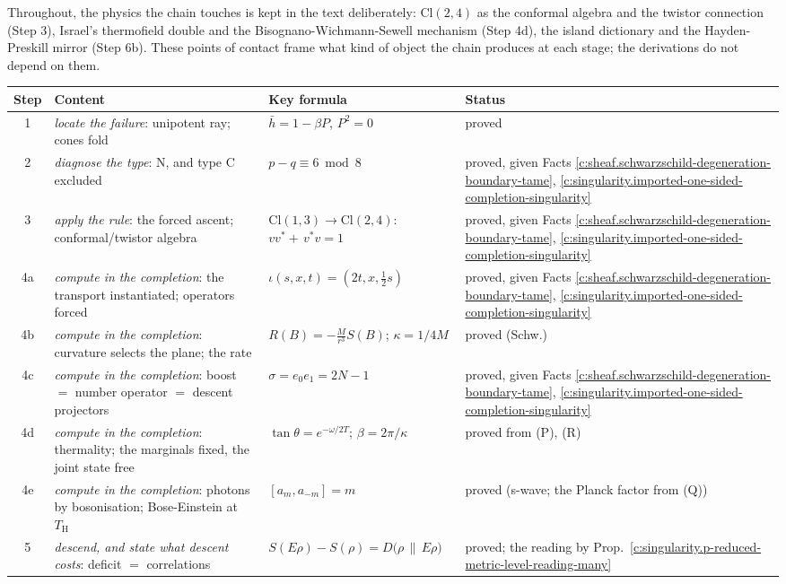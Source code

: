\documentclass[11pt]{article}
\theoremstyle{definition}
\theoremstyle{plain}
\providecommand{\Cl}{}\renewcommand{\Cl}{\mathrm{Cl}}
\providecommand{\TH}{}\renewcommand{\TH}{T_{\mathrm{H}}}
\providecommand{\hb}{}\renewcommand{\hb}{\bar{h}}
\providecommand{\rel}{}\renewcommand{\rel}[2]{D\bigl(#1 \,\|\, #2\bigr)}
\begin{document}
Throughout, the physics the chain touches is kept in the text deliberately: $\Cl(2,4)$ as the conformal algebra and the twistor connection (Step 3), Israel's thermofield double and the Bisognano-Wichmann-Sewell mechanism (Step 4d), the island dictionary and the Hayden-Preskill mirror (Step 6b). These points of contact frame what kind of object the chain produces at each stage; the derivations do not depend on them.

 \begin{tabular}{c>{ \arraybackslash}p{4.7cm}>{ \arraybackslash}p{4.6cm}l}
\toprule
Step & Content & Key formula & Status \\
\midrule
1 & \emph{locate the failure}: unipotent ray; cones fold & $\hb = 1 - \beta P$, $P^2 = 0$ & proved \\
2 & \emph{diagnose the type}: N, and type C excluded & $p - q \equiv 6 \bmod 8$ & proved, given Facts \ref{c:sheaf.schwarzschild-degeneration-boundary-tame}, \ref{c:singularity.imported-one-sided-completion-singularity} \\
3 & \emph{apply the rule}: the forced ascent; conformal/twistor algebra & $\Cl(1,3) \to \Cl(2,4)$: $vv^* {+}\, v^*v = 1$ & proved, given Facts \ref{c:sheaf.schwarzschild-degeneration-boundary-tame}, \ref{c:singularity.imported-one-sided-completion-singularity} \\
4a & \emph{compute in the completion}: the transport instantiated; operators forced & $\iota(s,x,t) = (2t, x, \tfrac12 s)$ & proved, given Facts \ref{c:sheaf.schwarzschild-degeneration-boundary-tame}, \ref{c:singularity.imported-one-sided-completion-singularity} \\
4b & \emph{compute in the completion}: curvature selects the plane; the rate & $R(B) = -\tfrac{M}{r^3}S(B)$; $\kappa = 1/4M$ & proved (Schw.) \\
4c & \emph{compute in the completion}: boost $=$ number operator $=$ descent projectors & $\sigma = e_0 e_1 = 2N - 1$ & proved, given Facts \ref{c:sheaf.schwarzschild-degeneration-boundary-tame}, \ref{c:singularity.imported-one-sided-completion-singularity} \\
4d & \emph{compute in the completion}: thermality; the marginals fixed, the joint state free & $\tan\theta = e^{-\omega/2T}$; $\beta = 2\pi/\kappa$ & proved from (P), (R) \\
4e & \emph{compute in the completion}: photons by bosonisation; Bose-Einstein at $\TH$ & $[a_m, a_{-m}] = m$ & proved (s-wave; the Planck factor from (Q)) \\
5 & \emph{descend, and state what descent costs}: deficit $=$ correlations & $S(E\rho) - S(\rho) = \rel{\rho}{E\rho}$ & proved; the reading by Prop.~\ref{c:singularity.p-reduced-metric-level-reading-many} \\

\end{tabular}
\end{document}
